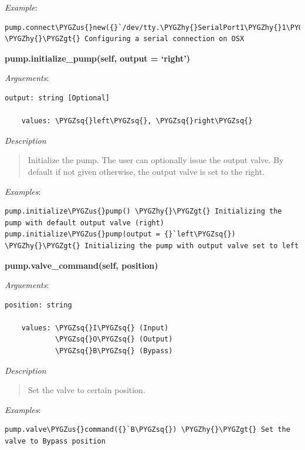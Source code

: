 \documentclass[letterpaper,10pt,english]{sphinxmanual}
\def\PYGZus{\char`\_}
\def\PYGZgt{\char`\>}
\def\PYGZhy{\char`\-}
\def\PYGZsq{\char`\'}
\begin{document}
\emph{Example}:

\begin{Verbatim}[commandchars=\\\{\}]
pump.connect\PYGZus{}new({}`/dev/tty.\PYGZhy{}SerialPort1\PYGZhy{}1\PYGZsq{}) \PYGZhy{}\PYGZgt{} Configuring a serial connection on OSX
\end{Verbatim}

\textbf{pump.initialize\_pump(self, output = `right')}

\emph{Arguements}:

\begin{Verbatim}[commandchars=\\\{\}]
output: string [Optional]

    values: \PYGZsq{}left\PYGZsq{}, \PYGZsq{}right\PYGZsq{}
\end{Verbatim}

\emph{Description}
\begin{quote}

Initialize the pump. The user can optionally issue the output valve. By default if not
given otherwise, the output valve is set to the right.
\end{quote}

\emph{Examples}:

\begin{Verbatim}[commandchars=\\\{\}]
pump.initialize\PYGZus{}pump() \PYGZhy{}\PYGZgt{} Initializing the pump with default output valve (right)
pump.initialize\PYGZus{}pump(output = {}`left\PYGZsq{}) \PYGZhy{}\PYGZgt{} Initializing the pump with output valve set to left
\end{Verbatim}

\textbf{pump.valve\_command(self, position)}

\emph{Arguements}:

\begin{Verbatim}[commandchars=\\\{\}]
position: string

    values: \PYGZsq{}I\PYGZsq{} (Input)
            \PYGZsq{}O\PYGZsq{} (Output)
            \PYGZsq{}B\PYGZsq{} (Bypass)
\end{Verbatim}

\emph{Description}
\begin{quote}

Set the valve to certain position.
\end{quote}

\emph{Examples}:

\begin{Verbatim}[commandchars=\\\{\}]
pump.valve\PYGZus{}command({}`B\PYGZsq{}) \PYGZhy{}\PYGZgt{} Set the valve to Bypass position
\end{Verbatim}
\end{document}
